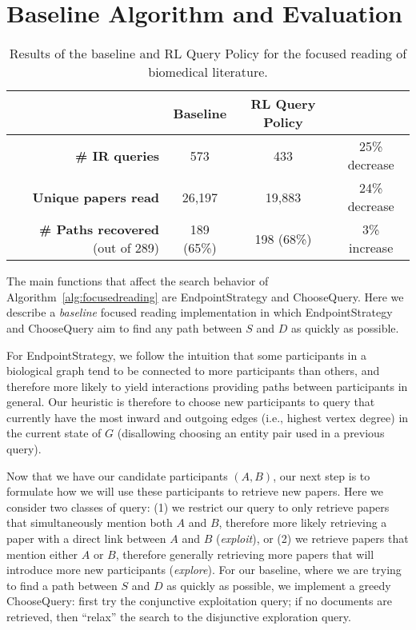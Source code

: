 \section{Baseline Algorithm and Evaluation}\label{sec:dataset}

\begin{table*}[t!]
  \begin{center}
  {\footnotesize
  \begin{tabular}{r|c|cc}
  	& \textbf{Baseline} & \textbf{RL Query Policy} & \\
  	\hline
    \textbf{\# IR queries} &  573 & 433 & 25\% decrease\\
    \textbf{Unique papers read} & 26,197 & 19,883 & 24\% decrease\\
    \textbf{\# Paths recovered} (out of 289) & 189 (65\%) & 198 (68\%) & 3\% increase
  \end{tabular}
  \caption{Results of the baseline and RL Query Policy for the focused reading of biomedical literature.}
  \vspace{-6mm}
  \label{table:reading-results}
  }
  \end{center}
\end{table*}

The main functions that affect the search behavior of Algorithm~\ref{alg:focusedreading} are {\sc EndpointStrategy} and {\sc ChooseQuery}.
Here we describe a {\em baseline} focused reading implementation in which {\sc EndpointStrategy} and {\sc ChooseQuery} aim to find any path between $S$ and $D$ as quickly as possible.

For {\sc EndpointStrategy}, we follow the intuition that some participants in a biological graph tend to be connected to more participants than others, and therefore more likely to yield interactions providing paths between participants in general.  Our heuristic is therefore to choose new participants to query that currently have the most inward and outgoing edges (i.e., highest vertex degree) in the current state of $G$ (disallowing choosing an entity pair used in a previous query).

Now that we have our candidate participants $(A,B)$, our next step is to formulate how we will use these participants to retrieve new papers.  Here we consider two classes of query: (1) we restrict our query to only retrieve papers that simultaneously mention both $A$ and $B$, therefore more likely retrieving a paper with a direct link between $A$ and $B$ ({\em exploit}), or (2) we retrieve papers that mention either $A$ or $B$, therefore generally retrieving more papers that will introduce more new participants ({\em explore}).  For our baseline, where we are trying to find a path between $S$ and $D$ as quickly as possible, we implement a greedy {\sc ChooseQuery}: first try the conjunctive exploitation query; if no documents are retrieved, then ``relax'' the search to the disjunctive exploration query.

